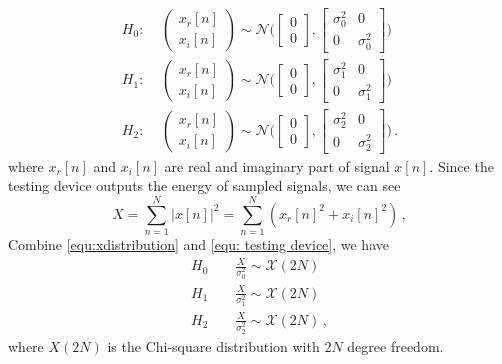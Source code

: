 \begin{equation}
  \begin{split}
  H_0:\;\;\;\;\begin{pmatrix} x_r[n] \\ x_i[n] \end{pmatrix} \sim \mathcal{N}\Big( \begin{bmatrix} 0 \\ 0 \end{bmatrix}, \begin{bmatrix} \sigma_0^2 & 0\\ 0 & \sigma_0^2 \end{bmatrix} \Big)\\
  H_1:\;\;\;\;\begin{pmatrix} x_r[n] \\ x_i[n] \end{pmatrix} \sim \mathcal{N}\Big( \begin{bmatrix} 0 \\ 0 \end{bmatrix}, \begin{bmatrix} \sigma_1^2 & 0\\ 0 & \sigma_1^2 \end{bmatrix} \Big)\\
  H_2:\;\;\;\;\begin{pmatrix} x_r[n] \\ x_i[n] \end{pmatrix} \sim \mathcal{N}\Big( \begin{bmatrix} 0 \\ 0 \end{bmatrix}, \begin{bmatrix} \sigma_2^2 & 0\\ 0 & \sigma_2^2 \end{bmatrix} \Big)\,.  
\end{split}
  \label{equ:xdistribution}
\end{equation}
where $x_r[n]$ and $x_i[n]$ are real and imaginary part of signal $x[n]$.
Since the testing device outputs the energy of sampled signals, we can see
\begin{equation}
  X = \sum_{n=1}^{N}|x[n]|^2 = \sum_{n=1}^{N}(x_r[n]^2+x_i[n]^2)\,,
  \label{equ: testing device}
\end{equation}
Combine \eqref{equ:xdistribution} and \eqref{equ: testing device}, we have 
\begin{equation} 
  \label{equ: abstract}
  \begin{split}
	H_0\;\;\;\;&\frac{X}{\sigma_0^2}\sim \mathcal{X}(2N)\\
	H_1\;\;\;\;&\frac{X}{\sigma_1^2}\sim \mathcal{X}(2N)\\
	H_2\;\;\;\;&\frac{X}{\sigma_2^2}\sim \mathcal{X}(2N)\,,
  \end{split}
\end{equation}
where $X(2N)$ is the Chi-square distribution with $2N$ degree freedom. 


